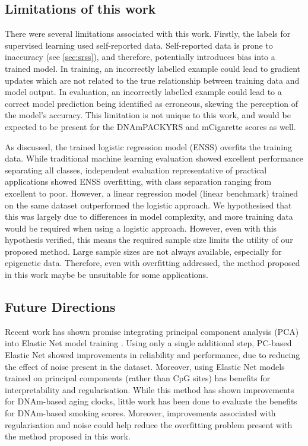 \documentclass{article} %
\begin{document}
\subsection{Limitations of this work} \label{sec:limitations}
There were several limitations associated with this work. Firstly, the labels for supervised learning used self-reported data. Self-reported data is prone to inaccuracy (see
\ref{sec:srss}), and therefore, potentially introduces bias into a trained model. In training, an incorrectly labelled example could lead to gradient updates which are not related to the true relationship between training data and model output. In evaluation, an incorrectly labelled example could lead to a correct model prediction being identified as erroneous, skewing the perception of the model's accuracy. This limitation is not unique to this work, and would be expected to be present for the DNAmPACKYRS and mCigarette scores as well.

As discussed, the trained logistic regression model (ENSS) overfits the training data. While traditional machine learning evaluation showed excellent performance separating all classes, independent evaluation representative of practical applications showed ENSS overfitting, with class separation ranging from excellent to poor. However, a linear regression model (linear benchmark) trained on the same dataset outperformed the logistic approach. We hypothesised that this was largely due to differences in model complexity, and more training data would be required when using a logistic approach. However, even with this hypothesis verified, this means the required sample size limits the utility of our proposed method. Large sample sizes are not always available, especially for epigenetic data. Therefore, even with overfitting addressed, the method proposed in this work maybe be unsuitable for some applications.

\subsection{Future Directions}
Recent work has shown promise integrating principal component analysis (PCA) into Elastic Net model training \cite{higgins2022computational}. Using only a single additional step, PC-based Elastic Net showed improvements in reliability and performance, due to reducing the effect of noise present in the dataset. Moreover, using Elastic Net models trained on principal components (rather than CpG sites) has benefits for interpretability and regularisation. While this method has shown improvements for DNAm-based aging clocks, little work has been done to evaluate the benefits for DNAm-based smoking scores. Moreover, improvements associated with regularisation and noise could help reduce the overfitting problem present with the method proposed in this work.
\end{document}
